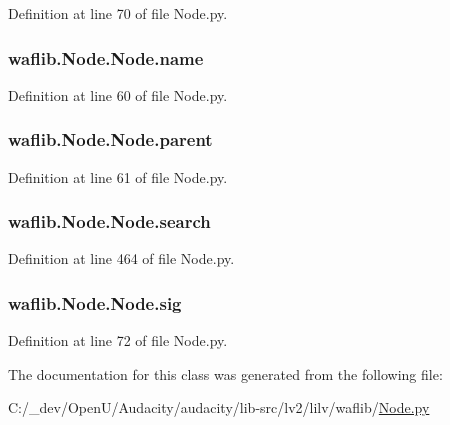 Definition at line 70 of file Node.\+py.

\subsubsection[{\texorpdfstring{name}{name}}]{\setlength{\rightskip}{0pt plus 5cm}waflib.\+Node.\+Node.\+name}\hypertarget{classwaflib_1_1_node_1_1_node_ab8fdb615c47321fbc115cb2430fd3ef7}{}\label{classwaflib_1_1_node_1_1_node_ab8fdb615c47321fbc115cb2430fd3ef7}


Definition at line 60 of file Node.\+py.

\subsubsection[{\texorpdfstring{parent}{parent}}]{\setlength{\rightskip}{0pt plus 5cm}waflib.\+Node.\+Node.\+parent}\hypertarget{classwaflib_1_1_node_1_1_node_a2136fddf4c5e98dc8d1661bee03e725c}{}\label{classwaflib_1_1_node_1_1_node_a2136fddf4c5e98dc8d1661bee03e725c}


Definition at line 61 of file Node.\+py.

\subsubsection[{\texorpdfstring{search}{search}}]{\setlength{\rightskip}{0pt plus 5cm}waflib.\+Node.\+Node.\+search\hspace{0.3cm}{\ttfamily [static]}}\hypertarget{classwaflib_1_1_node_1_1_node_ae8de653896ed63177d3378fca1264adf}{}\label{classwaflib_1_1_node_1_1_node_ae8de653896ed63177d3378fca1264adf}


Definition at line 464 of file Node.\+py.

\subsubsection[{\texorpdfstring{sig}{sig}}]{\setlength{\rightskip}{0pt plus 5cm}waflib.\+Node.\+Node.\+sig}\hypertarget{classwaflib_1_1_node_1_1_node_aeabaa25d785f8b25cff12c30ebb2dd41}{}\label{classwaflib_1_1_node_1_1_node_aeabaa25d785f8b25cff12c30ebb2dd41}


Definition at line 72 of file Node.\+py.



The documentation for this class was generated from the following file\+:\begin{DoxyCompactItemize}
\item 
C\+:/\+\_\+dev/\+Open\+U/\+Audacity/audacity/lib-\/src/lv2/lilv/waflib/\hyperlink{lilv_2waflib_2_node_8py}{Node.\+py}\end{DoxyCompactItemize}
